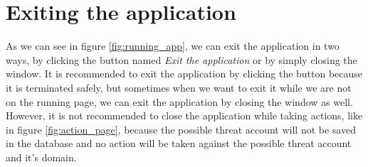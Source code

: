\section{Exiting the application}
As we can see in figure \ref{fig:running_app}, we can exit the application in two ways, by clicking the button named \textit{Exit the application} or by simply closing the window. It is recommended to exit the application by clicking the button because it is terminated safely, but sometimes when we want to exit it while we are not on the running page, we can exit the application by closing the window as well. However, it is not recommended to close the application while taking actions, like in figure \ref{fig:action_page}, because the possible threat account will not be saved in the database and no action will be taken against the possible threat account and it's domain.




